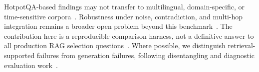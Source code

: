 HotpotQA-based findings may not transfer to multilingual,
domain-specific, or time-sensitive corpora~\cite{elkiran2026empirical,zeng2025rare,li2025biomedical}.
Robustness under noise, contradiction, and multi-hop integration remains
a broader open problem beyond this benchmark~\cite{chen2023rgb,zeng2025rare,li2025biomedical}.
The contribution here is a reproducible comparison harness, not a
definitive answer to all production RAG selection questions~\cite{wu2024survey,sharma2025survey}.
Where possible, we distinguish retrieval-supported failures from
generation failures, following disentangling and diagnostic evaluation
work~\cite{mala2026faithfulness,murugaraj2025ragvue}.
